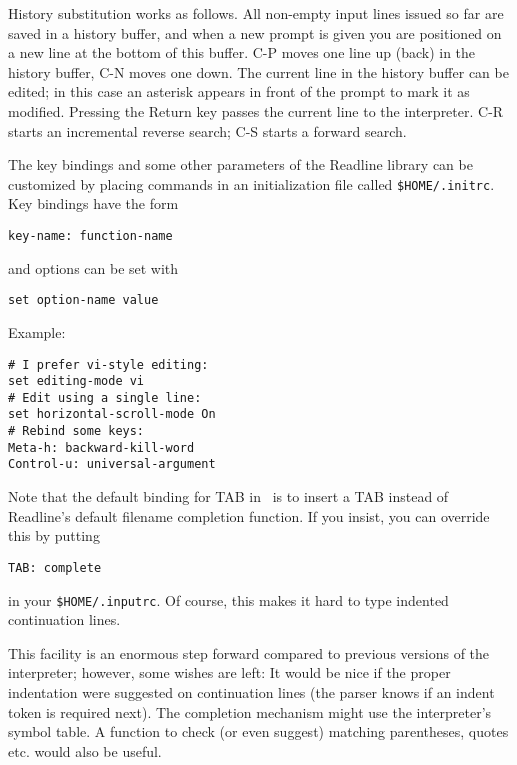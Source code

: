 History substitution works as follows.
All non-empty input lines issued so far are saved in a history buffer,
and when a new prompt is given you are positioned on a new line at the
bottom of this buffer.
C-P moves one line up (back) in the history buffer, C-N moves one down.
The current line in the history buffer can be edited; in this case an
asterisk appears in front of the prompt to mark it as modified.
Pressing the Return key passes the current line to the interpreter.
C-R starts an incremental reverse search; C-S starts a forward search.

The key bindings and some other parameters of the Readline library can
be customized by placing commands in an initialization file called
{\tt \$HOME/.initrc}.
Key bindings have the form
\begin{code}\begin{verbatim}
key-name: function-name
\end{verbatim}\end{code}
and options can be set with
\begin{code}\begin{verbatim}
set option-name value
\end{verbatim}\end{code}
Example:
\begin{code}\begin{verbatim}
# I prefer vi-style editing:
set editing-mode vi
# Edit using a single line:
set horizontal-scroll-mode On
# Rebind some keys:
Meta-h: backward-kill-word
Control-u: universal-argument
\end{verbatim}\end{code}
Note that the default binding for TAB in \Python\ is to insert a TAB
instead of Readline's default filename completion function.
If you insist, you can override this by putting
\begin{code}\begin{verbatim}
TAB: complete
\end{verbatim}\end{code}
in your
{\tt \$HOME/.inputrc}.
Of course, this makes it hard to type indented continuation lines.

This facility is an enormous step forward compared to previous versions of
the interpreter; however, some wishes are left:
It would be nice if the proper indentation were suggested on
continuation lines (the parser knows if an indent token is required
next).
The completion mechanism might use the interpreter's symbol table.
A function to check (or even suggest) matching parentheses, quotes
etc. would also be useful.

